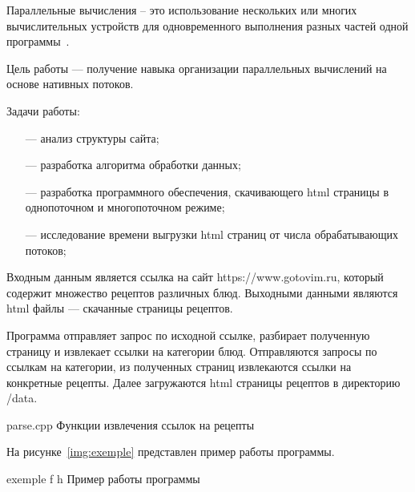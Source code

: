 

Параллельные вычисления – это использование нескольких или многих вычислительных устройств для одновременного выполнения разных частей одной программы~\cite{gafarov_paral}.

Цель работы --- получение навыка организации параллельных вычислений на основе нативных потоков. 

Задачи работы: 
\begin{itemize}
	\item[---] анализ структуры сайта;
	\item[---] разработка алгоритма обработки данных;
	\item[---] разработка программного обеспечения, скачивающего html страницы в однопоточном и многопоточном режиме;
	\item[---] исследование времени выгрузки html страниц от числа обрабатывающих потоков;
\end{itemize}



Входным данным является ссылка на сайт https://www.gotovim.ru, который содержит множество рецептов различных блюд. Выходными данными являются html файлы --- скачанные страницы рецептов.



Программа отправляет запрос по исходной ссылке, разбирает полученную страницу и извлекает ссылки на категории блюд. Отправляются запросы по ссылкам на категории, из полученных страниц извлекаются ссылки на конкретные рецепты. Далее загружаются html страницы рецептов в директорию /data.

{parse.cpp} %
{Функции извлечения ссылок на рецепты} %

На рисунке~\ref{img:exemple} представлен пример работы программы.

\FloatBarrier
{}
{exemple} %
{f} %
{h} %
{\textwidth} %
{Пример работы программы} %
\FloatBarrier



